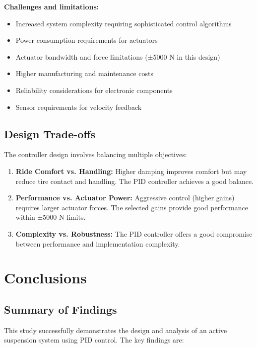 \documentclass[12pt,a4paper]{article}
\begin{document}
\textbf{Challenges and limitations:}
\begin{itemize}
    \item Increased system complexity requiring sophisticated control algorithms
    \item Power consumption requirements for actuators
    \item Actuator bandwidth and force limitations (±5000 N in this design)
    \item Higher manufacturing and maintenance costs
    \item Reliability considerations for electronic components
    \item Sensor requirements for velocity feedback
\end{itemize}

\subsection{Design Trade-offs}

The controller design involves balancing multiple objectives:

\begin{enumerate}
    \item \textbf{Ride Comfort vs. Handling:} Higher damping improves comfort but may reduce tire contact and handling. The PID controller achieves a good balance.
    
    \item \textbf{Performance vs. Actuator Power:} Aggressive control (higher gains) requires larger actuator forces. The selected gains provide good performance within ±5000 N limits.
    
    \item \textbf{Complexity vs. Robustness:} The PID controller offers a good compromise between performance and implementation complexity.
\end{enumerate}

\section{Conclusions}

\subsection{Summary of Findings}

This study successfully demonstrates the design and analysis of an active suspension system using PID control. The key findings are:
\end{document}
